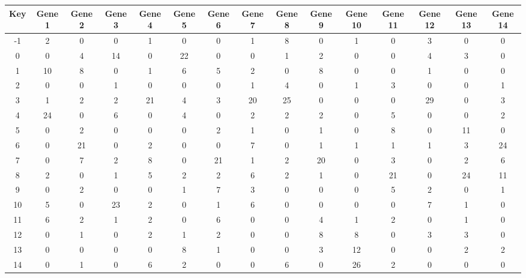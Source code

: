 \begin{tabular}{|c|c|c|c|c|c|c|c|c|c|c|c|c|c|c|}
\hline
Key & Gene 1 & Gene 2 & Gene 3 & Gene 4 & Gene 5 & Gene 6 & Gene 7 & Gene 8 & Gene 9 & Gene 10 & Gene 11 & Gene 12 & Gene 13 & Gene 14 \\
\hline
-1 & 2 & 0 & 0 & 1 & 0 & 0 & 1 & 8 & 0 & 1 & 0 & 3 & 0 & 0 \\
0 & 0 & 4 & 14 & 0 & 22 & 0 & 0 & 1 & 2 & 0 & 0 & 4 & 3 & 0 \\
1 & 10 & 8 & 0 & 1 & 6 & 5 & 2 & 0 & 8 & 0 & 0 & 1 & 0 & 0 \\
2 & 0 & 0 & 1 & 0 & 0 & 0 & 1 & 4 & 0 & 1 & 3 & 0 & 0 & 1 \\
3 & 1 & 2 & 2 & 21 & 4 & 3 & 20 & 25 & 0 & 0 & 0 & 29 & 0 & 3 \\
4 & 24 & 0 & 6 & 0 & 4 & 0 & 2 & 2 & 2 & 0 & 5 & 0 & 0 & 2 \\
5 & 0 & 2 & 0 & 0 & 0 & 2 & 1 & 0 & 1 & 0 & 8 & 0 & 11 & 0 \\
6 & 0 & 21 & 0 & 2 & 0 & 0 & 7 & 0 & 1 & 1 & 1 & 1 & 3 & 24 \\
7 & 0 & 7 & 2 & 8 & 0 & 21 & 1 & 2 & 20 & 0 & 3 & 0 & 2 & 6 \\
8 & 2 & 0 & 1 & 5 & 2 & 2 & 6 & 2 & 1 & 0 & 21 & 0 & 24 & 11 \\
9 & 0 & 2 & 0 & 0 & 1 & 7 & 3 & 0 & 0 & 0 & 5 & 2 & 0 & 1 \\
10 & 5 & 0 & 23 & 2 & 0 & 1 & 6 & 0 & 0 & 0 & 0 & 7 & 1 & 0 \\
11 & 6 & 2 & 1 & 2 & 0 & 6 & 0 & 0 & 4 & 1 & 2 & 0 & 1 & 0 \\
12 & 0 & 1 & 0 & 2 & 1 & 2 & 0 & 0 & 8 & 8 & 0 & 3 & 3 & 0 \\
13 & 0 & 0 & 0 & 0 & 8 & 1 & 0 & 0 & 3 & 12 & 0 & 0 & 2 & 2 \\
14 & 0 & 1 & 0 & 6 & 2 & 0 & 0 & 6 & 0 & 26 & 2 & 0 & 0 & 0 \\
\hline
\end{tabular}